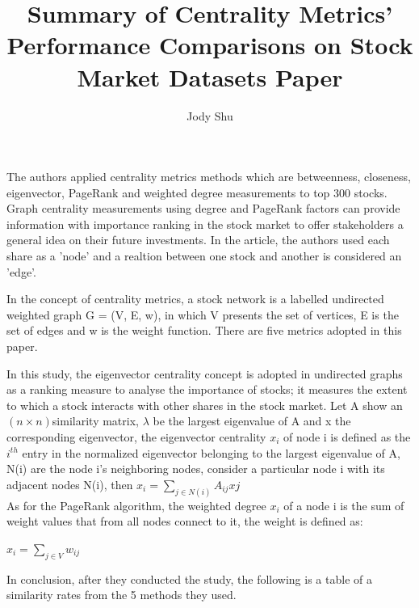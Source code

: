 \documentclass[11pt, oneside]{article}   	%
\title{Summary of Centrality Metrics' Performance Comparisons on Stock Market Datasets Paper}
\author{Jody Shu}
\begin{document}
\begin{Large}
\maketitle
The authors applied centrality metrics methods which are betweenness, closeness, eigenvector, PageRank and weighted degree measurements to top 300 stocks.  Graph centrality measurements using degree and PageRank factors can provide information with importance ranking in the stock market to offer stakeholders a general idea on their future investments.  In the article, the authors used each share as a 'node' and a realtion between one stock and another is considered an 'edge'.  

In the concept of centrality metrics, a stock network is a labelled undirected weighted graph G = (V, E, w), in which V presents the set of vertices, E is the set of edges and w is the weight function.  There are five metrics adopted in this paper.



In this study, the eigenvector centrality concept is adopted in undirected graphs as a ranking measure to analyse the importance of stocks; it measures the extent to which a stock interacts with other shares in the stock market. Let A show an $(n\times n)$similarity matrix, $\lambda$ be the largest eigenvalue of A and x the corresponding eigenvector, the eigenvector centrality $x_i$ of node i is defined as the $i^{th}$ entry in the normalized eigenvector belonging to the largest eigenvalue of A, N(i) are the node i’s neighboring nodes, consider a particular node i with its adjacent nodes N(i), then
$x_i=\sum_{j\in N(i)} A_{ij}x{j}$\\

As for the PageRank algorithm, the weighted degree $x_i$ of a node i is the sum of weight values that from all nodes connect to it, the weight is defined as:

$x_i=\sum_{j\in V} w_{ij}$

In conclusion, after they conducted the study, the following is a table of a similarity rates from the 5 methods they used.


\end{Large}
\end{document}
